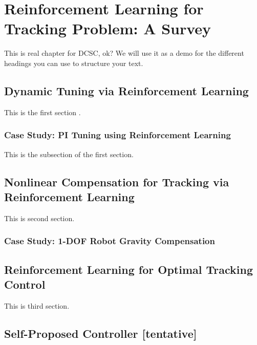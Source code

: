 %
\chapter{Reinforcement Learning for Tracking Problem: A Survey}

This is real chapter for \ac{DCSC}, ok? We will use it as a demo for the different headings you can use to structure your text.


\section{Dynamic Tuning via Reinforcement Learning}
This is the first section .

\subsection{Case Study: PI Tuning using Reinforcement Learning}
This is the subsection of the first section.

\section{Nonlinear Compensation for Tracking via Reinforcement Learning}
This is second section.
\subsection{Case Study: 1-DOF Robot Gravity Compensation}

\section{Reinforcement Learning for Optimal Tracking Control}
This is third section.

\section{Self-Proposed Controller [tentative]}

